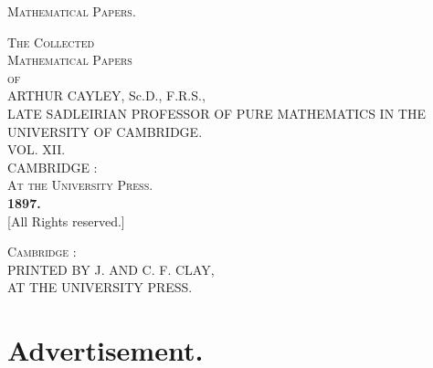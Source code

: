 \documentclass[11pt,a4paper]{article}
\theoremstyle{definition}
\theoremstyle{remark}
\begin{document}
\thispagestyle{empty}
\begin{center}
\vspace*{4cm}
{\LARGE\scshape Mathematical Papers.}
\vfill
\end{center}
\cleardoublepage

\thispagestyle{empty}
\begin{center}
\vspace*{1cm}
{\Large\scshape The Collected}\\[0.5cm]
{\Huge\scshape Mathematical Papers}\\[1cm]
{\large\scshape of}\\[1cm]
{\LARGE ARTHUR CAYLEY, Sc.D., F.R.S.,}\\[0.3cm]
{\small LATE SADLEIRIAN PROFESSOR OF PURE MATHEMATICS IN THE UNIVERSITY OF CAMBRIDGE.}\\[2cm]
{\LARGE VOL. XII.}\\[2cm]
{\large CAMBRIDGE :}\\[0.3cm]
{\scshape At the University Press.}\\[0.3cm]
{\bfseries 1897.}\\[0.5cm]
{[All Rights reserved.]}\\
\end{center}
\cleardoublepage

\thispagestyle{empty}
\vspace*{\fill}
\begin{center}
{\scshape Cambridge} :\\[0.3cm]
PRINTED BY J. AND C. F. CLAY,\\
AT THE UNIVERSITY PRESS.\\
\end{center}
\vspace*{\fill}
\cleardoublepage

\section*{Advertisement.}
\end{document}
